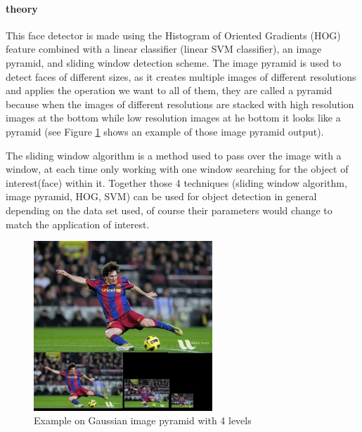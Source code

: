 \paragraph{theory}
This face detector is made using the Histogram of Oriented Gradients (HOG) feature combined with a linear classifier (linear SVM classifier), an image pyramid, and sliding window detection scheme. \newline
The image pyramid is used to detect faces of different sizes, as it creates multiple images of different resolutions and applies the operation we want to all of them, they are called a pyramid because when the images of different resolutions are stacked with high resolution images at the bottom while low resolution images at he bottom it looks like a pyramid (see Figure \ref{fig:gaussian_pyramid} shows an example of those image pyramid output).
\newline

The sliding window algorithm is a method used to pass over the image with a window, at each time only working with one window searching for the object of interest(face) within it.
\newline
Together those 4 techniques (sliding window algorithm, image pyramid, HOG, SVM) can be used for object detection in general depending on the data set used, of course their parameters would change to match the application of interest.

\begin{figure}
	\centering
	\includegraphics[width=0.6\textwidth]{images/gaussian_pyramid.jpg}
	\caption{Example on Gaussian image pyramid with 4 levels}
	\label{fig:gaussian_pyramid}
\end{figure}

